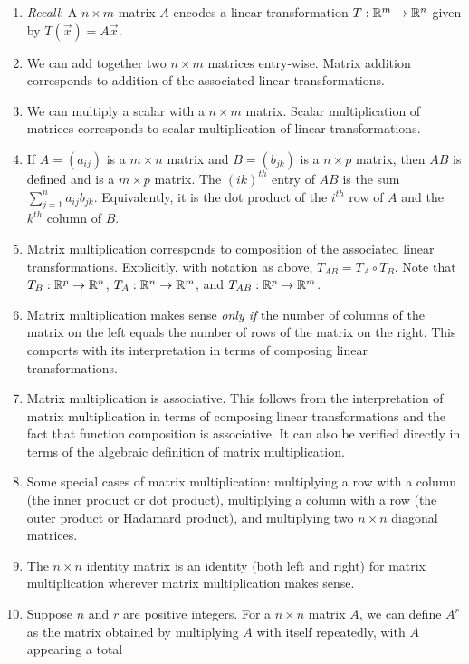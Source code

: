 \documentclass[10pt]{amsart}
\begin{document}
\begin{enumerate}
\item {\em Recall}: A $n \times m$ matrix $A$ encodes a linear
  transformation $T:\mathbb{R}^m \to \mathbb{R}^n$ given by $T(\vec{x}) = A\vec{x}$.
\item We can add together two $n \times m$ matrices entry-wise. Matrix
  addition corresponds to addition of the associated linear
  transformations.
\item We can multiply a scalar with a $n \times m$ matrix. Scalar
  multiplication of matrices corresponds to scalar multiplication of
  linear transformations.
\item If $A = (a_{ij})$ is a $m \times n$ matrix and $B = (b_{jk})$ is
  a $n \times p$ matrix, then $AB$ is defined and is a $m \times p$
  matrix. The $(ik)^{th}$ entry of $AB$ is the sum $\sum_{j=1}^n
  a_{ij}b_{jk}$. Equivalently, it is the dot product of the $i^{th}$
  row of $A$ and the $k^{th}$ column of $B$.
\item Matrix multiplication corresponds to composition of the
  associated linear transformations. Explicitly, with notation as
  above, $T_{AB} = T_A \circ T_B$. Note that $T_B: \mathbb{R}^p \to \mathbb{R}^n$,
  $T_A: \mathbb{R}^n \to \mathbb{R}^m$, and $T_{AB}: \mathbb{R}^p \to \mathbb{R}^m$.
\item Matrix multiplication makes sense {\em only if} the number of
  columns of the matrix on the left equals the number of rows of the
  matrix on the right. This comports with its interpretation in terms
  of composing linear transformations.
\item Matrix multiplication is associative. This follows from the
  interpretation of matrix multiplication in terms of composing linear
  transformations and the fact that function composition is
  associative. It can also be verified directly in terms of the
  algebraic definition of matrix multiplication.
\item Some special cases of matrix multiplication: multiplying a row
  with a column (the inner product or dot product), multiplying a
  column with a row (the outer product or Hadamard product), and
  multiplying two $n \times n$ diagonal matrices.
\item The $n \times n$ identity matrix is an identity (both left and
  right) for matrix multiplication wherever matrix multiplication
  makes sense.
\item Suppose $n$ and $r$ are positive integers. For a $n \times n$
  matrix $A$, we can define $A^r$ as the matrix obtained by
  multiplying $A$ with itself repeatedly, with $A$ appearing a total

\end{enumerate}
\end{document}
